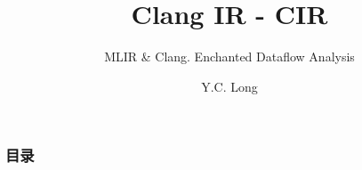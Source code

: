 \documentclass[aspectratio=169]{ctexbeamer}
\title{Clang IR - CIR}
\subtitle{MLIR \& Clang. Enchanted Dataflow Analysis}
\author{Y.C. Long}
\institute{Intern @ ISCAS - PLCT Lab}
\begin{document}
\maketitle
\begin{frame}
    \frametitle{目录}

    \tableofcontents

\end{frame}




\end{document}
